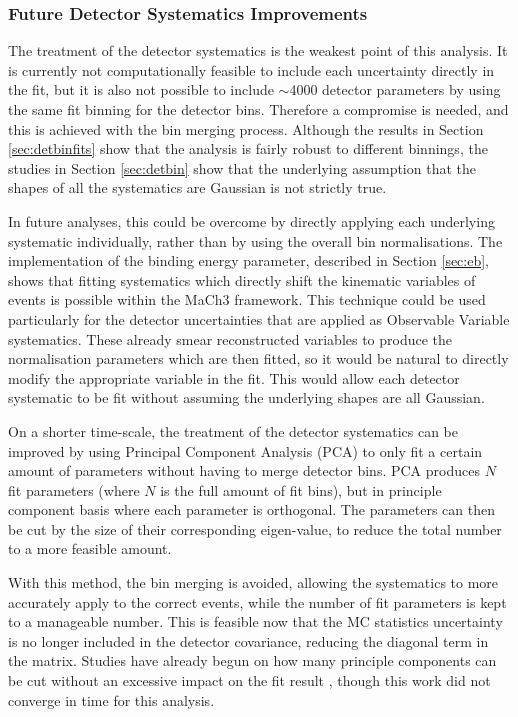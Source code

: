 \subsubsection{Future Detector Systematics Improvements}\label{sec:detimprove}

The treatment of the detector systematics is the weakest point of this analysis. It is currently not computationally feasible to include each uncertainty directly in the fit, but it is also not possible to include $\sim$4000 detector parameters by using the same fit binning for the detector bins. Therefore a compromise is needed, and this is achieved with the bin merging process. Although the results in Section \ref{sec:detbinfits} show that the analysis is fairly robust to different binnings, the studies in Section \ref{sec:detbin} show that the underlying assumption that the shapes of all the systematics are Gaussian is not strictly true. 

In future analyses, this could be overcome by directly applying each underlying systematic individually, rather than by using the overall bin normalisations. The implementation of the binding energy parameter, described in Section \ref{sec:eb}, shows that fitting systematics which directly shift the kinematic variables of events is possible within the MaCh3 framework. This technique could be used particularly for the detector uncertainties that are applied as Observable Variable systematics. These already smear reconstructed variables to produce the normalisation parameters which are then fitted, so it would be natural to directly modify the appropriate variable in the fit. This would allow each detector systematic to be fit without assuming the underlying shapes are all Gaussian.

On a shorter time-scale, the treatment of the detector systematics can be improved by using Principal Component Analysis (PCA) to only fit a certain amount of parameters without having to merge detector bins. PCA produces $N$ fit parameters (where $N$ is the full amount of fit bins), but in principle component basis where each parameter is orthogonal. The parameters can then be cut by the size of their corresponding eigen-value, to reduce the total number to a more feasible amount.

With this method, the bin merging is avoided, allowing the systematics to more accurately apply to the correct events, while the number of fit parameters is kept to a manageable number. This is feasible now that the MC statistics uncertainty is no longer included in the detector covariance, reducing the diagonal term in the matrix. Studies have already begun on how many principle components can be cut without an excessive impact on the fit result \cite{tn395}, though this work did not converge in time for this analysis.

